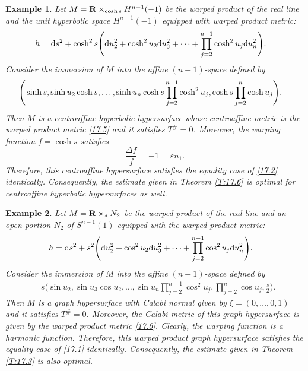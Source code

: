 \documentclass{amsart}
\theoremstyle{plain}
\newtheorem{example}{Example}[section]
\numberwithin{equation}{section}
\theoremstyle{remark}
\numberwithin{equation}{section}
\begin{document}
\begin{example}\label{E:17.2} {\rm Let $M={\bf R}\times_{\cosh s} H^{n-1}(-1)$  be  the  warped product of the real line and the unit hyperbolic space $H^{n-1}(-1)$ equipped with warped product metric: 
\begin{equation}\begin{aligned}\label{17.5} &h={\rm d}s^2+\cosh^2 s \Bigg({\rm d}u_2^2+\cosh^2u_2{\rm d}u_3^2+\cdots+\prod_{j=2}^{n-1}\cosh^2 u_j{\rm d}
u_n^2\Bigg).
\end{aligned}\end{equation}
Consider the immersion of $M$ into the affine $(n+1)$-space  defined by
\begin{equation}\begin{aligned}\notag&\Bigg(\sinh s,\sinh u_2\cosh s,\ldots, \sinh u_n \cosh s\prod_{j=2}^{n-1}\cosh^2 u_j ,\cosh s\prod_{j=2}^{n}\cosh u_j\Bigg).\end{aligned}\end{equation}
Then $M$ is a centroaffine hyperbolic  hypersurface whose  centroaffine metric is the warped product metric  \eqref{17.5} and it
satisfies $T^\#=0$. Moreover, the warping function $f=\cosh s$ satisfies $$\frac{\Delta f}{f}=-1=\varepsilon n_1.$$ Therefore, this centroaffine hypersurface satisfies the equality case of \eqref{17.2} identically. Consequently, the estimate given in Theorem \ref{T:17.6} is optimal for centroaffine  hyperbolic hypersurfaces as well.}
\end{example}

\begin{example}\label{E:17.3} {\rm Let $M={\bf R}\times_{s} N_2$  be  the warped product of the real line and an open portion $N_2$ of  $S^{n-1}(1)$ equipped with the warped product metric: 
\begin{equation}\begin{aligned}\label{17.6} &h={\rm d}s^2+ s^2 \Bigg({\rm d}u_2^2+\cos^2u_2{\rm d}u_3^2+\cdots+\prod_{j=2}^{n-1}\cos^2 u_j{\rm d}
u_n^2\Bigg).
\end{aligned}\end{equation}
Consider the immersion of $M$ into the affine $(n+1)$-space  defined by
\begin{equation}\begin{aligned}\label{17.7} & s \Bigg( \sin u_2, \sin u_3\cos u_2,\ldots, \sin u_n \prod_{j=2}^{n-1}\cos^2 u_j , \prod_{j=2}^{n}\cos u_j, \frac{s}{2}\Bigg).
\end{aligned}\end{equation}
Then $M$ is a graph hypersurface with Calabi normal  given by $\xi=(0,\ldots,0,1)$ and it satisfies $T^\#=0$. Moreover, the  Calabi metric of this graph hypersurface is given by the warped product metric  \eqref{17.6}. Clearly, the warping function  is a harmonic function. Therefore, this warped product graph hypersurface satisfies the equality case of \eqref{17.1} identically. Consequently, the estimate given in Theorem \ref{T:17.3} is also optimal.}
\end{example}
\end{document}
